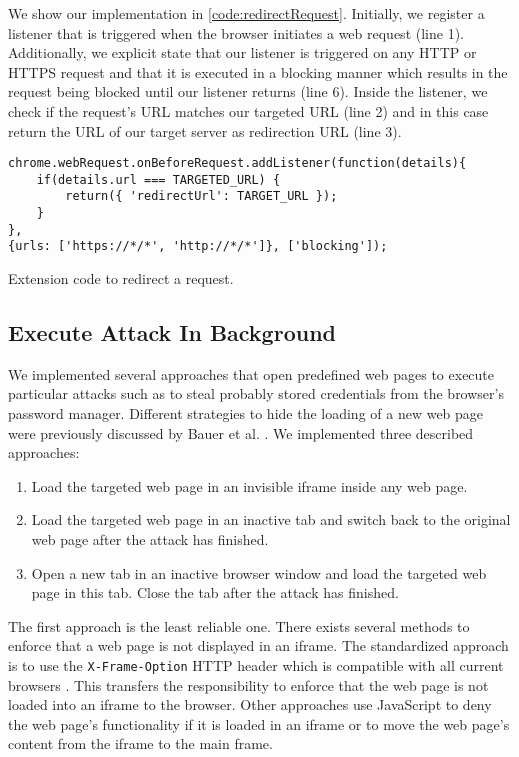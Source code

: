 	We show our implementation in \autoref{code:redirectRequest}. Initially, we register a listener that is triggered when the browser initiates a web request (line 1). Additionally, we explicit state that our listener is triggered on any HTTP or HTTPS request and that it is executed in a blocking manner which results in the request being blocked until our listener returns (line 6). Inside the listener, we check if the request's URL matches our targeted URL (line 2) and in this case return the URL of our target server as redirection URL (line 3).
	
	\begin{code}
		\begin{lstlisting}
chrome.webRequest.onBeforeRequest.addListener(function(details){
	if(details.url === TARGETED_URL) {	
		return({ 'redirectUrl': TARGET_URL });
	}
},
{urls: ['https://*/*', 'http://*/*']}, ['blocking']);	
\end{lstlisting}
		\caption{Extension code to redirect a request.}
		\label{code:redirectRequest}
	\end{code}
	
	
\subsection{Execute Attack In Background}
\label{sec:executeAttackInBackground}

	We implemented several approaches that open predefined web pages to execute particular attacks such as to steal probably stored credentials from the browser's password manager. Different strategies to hide the loading of a new web page were previously discussed by Bauer et al. \cite{extensions:cns14}. We implemented three described approaches:
	
	\begin{enumerate}
		\item Load the targeted web page in an invisible iframe inside any web page.
		\item Load the targeted web page in an inactive tab and switch back to the original web page after the attack has finished.
		\item Open a new tab in an inactive browser window and load the targeted web page in this tab. Close the tab after the attack has finished.
	\end{enumerate} 
	
	The first approach is the least reliable one. There exists several methods to enforce that a web page is not displayed in an iframe. The standardized approach is to use the \texttt{X-Frame-Option} HTTP header which is compatible with all current browsers \cite{xFrameOptionsSpezification, xFrameOptionsCompability}. This transfers the responsibility to enforce that the web page is not loaded into an iframe to the browser. Other approaches use JavaScript to deny the web page's functionality if it is loaded in an iframe or to move the web page's content from the iframe to the main frame.
		

